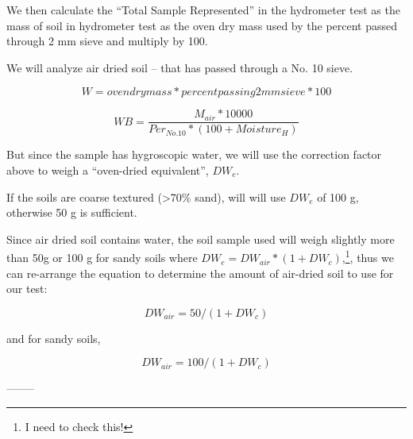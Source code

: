 \documentclass[12pt]{../SOP4_alpha}\usepackage[]{graphicx}\usepackage[]{xcolor}
\begin{document}
\NP We then calculate the ``Total Sample Represented'' in the hydrometer test as the mass of soil in hydrometer test as the oven dry mass used by the percent passed through 2 mm sieve and multiply by 100.

\NP We will analyze air dried soil -- that has passed through a No. 10 sieve. 

\begin{equation}
W = oven dry mass * percent passing 2mm sieve * 100
\end{equation}

\begin{equation}
WB = \frac{M_{air}*10000}{Per_{No.10} * (100 + Moisture_H)}
\end{equation}

\NP But since the sample has hygroscopic water, we will use the correction factor above to weigh a ``oven-dried equivalent'', $DW_e$. 

\NP If the soils are coarse textured (>70\% sand), will will use $DW_e$ of 100 g, otherwise 50 g is sufficient.

\NP Since air dried soil contains water, the soil sample used will weigh slightly more than 50g or 100 g for sandy soils where $DW_e = DW_{air} * (1 + DW_c)$,\footnote{I need to check this!}, thus we can re-arrange the equation to determine the amount of air-dried soil to use for our test:

\begin{equation}
DW_{air} = 50/(1+DW_c)
\end{equation}

\noindent and for sandy soils,

\begin{equation}
DW_{air} = 100/(1+DW_c)
\end{equation}



--------
\end{document}
